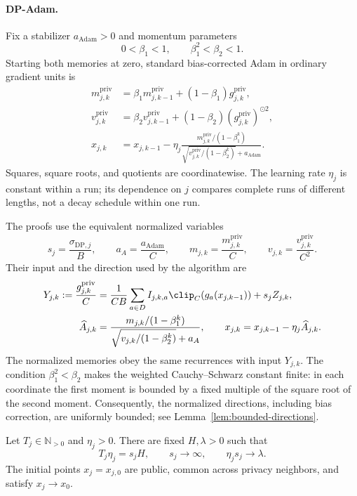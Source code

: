 \paragraph{DP-Adam.}
Fix a stabilizer $a_{\mathrm{Adam}}>0$ and momentum parameters
\begin{equation}\label{eq:betas}
 0<\beta_1<1,\qquad \beta_1^2<\beta_2<1.
\end{equation}
Starting both memories at zero, standard bias-corrected Adam in ordinary
gradient units is
\begin{align}
 m^{\mathrm{priv}}_{j,k}
 &=\beta_1m^{\mathrm{priv}}_{j,k-1}
        +(1-\beta_1)g^{\mathrm{priv}}_{j,k},\nonumber\\
 v^{\mathrm{priv}}_{j,k}
 &=\beta_2v^{\mathrm{priv}}_{j,k-1}
        +(1-\beta_2)(g^{\mathrm{priv}}_{j,k})^{\odot2},\label{eq:adam}\\
 x_{j,k}
 &=x_{j,k-1}-\eta_j
 \frac{m^{\mathrm{priv}}_{j,k}/(1-\beta_1^k)}
 {\sqrt{v^{\mathrm{priv}}_{j,k}/(1-\beta_2^k)}+a_{\mathrm{Adam}}}.
 \nonumber
\end{align}
Squares, square roots, and quotients are coordinatewise. The learning
rate $\eta_j$ is constant within a run; its dependence on $j$ compares
complete runs of different lengths, not a decay schedule within one run.

The proofs use the equivalent normalized variables
\[
 s_j=\frac{\sigma_{\mathrm{DP},j}}B,\qquad
 a_A=\frac{a_{\mathrm{Adam}}}C,\qquad
 m_{j,k}=\frac{m^{\mathrm{priv}}_{j,k}}C,\qquad
 v_{j,k}=\frac{v^{\mathrm{priv}}_{j,k}}{C^2}.
\]
Their input and the direction used by the algorithm are
\begin{align}
 Y_{j,k}:=\frac{g^{\mathrm{priv}}_{j,k}}C
 &=\frac1{CB}\sum_{a\in D}I_{j,k,a}
       \clip_C(g_a(x_{j,k-1}))+s_jZ_{j,k},\label{eq:release}\\
 \widehat A_{j,k}
 &=\frac{m_{j,k}/(1-\beta_1^k)}
 {\sqrt{v_{j,k}/(1-\beta_2^k)}+a_A},
 \qquad x_{j,k}=x_{j,k-1}-\eta_j\widehat A_{j,k}.
 \label{eq:normalized-direction}
\end{align}
The normalized memories obey the same recurrences with input $Y_{j,k}$.
The condition $\beta_1^2<\beta_2$ makes the weighted Cauchy--Schwarz
constant finite: in each coordinate the first moment is bounded by a
fixed multiple of the square root of the second moment. Consequently,
the normalized directions, including bias correction, are uniformly
bounded; see Lemma~\ref{lem:bounded-directions}.

\begin{assumption}\label{ass:clock}
Let $T_j\in\mathbb N_{>0}$ and $\eta_j>0$. There are fixed $H,\lambda>0$
such that
\begin{equation}\label{eq:clock}
 T_j\eta_j=s_jH,\qquad s_j\longrightarrow\infty,
 \qquad \eta_js_j\longrightarrow\lambda.
\end{equation}
The initial points $x_j=x_{j,0}$ are public, common across privacy
neighbors, and satisfy $x_j\to x_0$.
\end{assumption}

